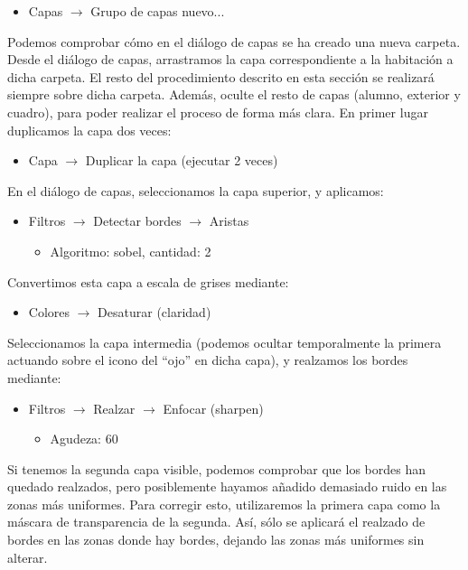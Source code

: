 \documentclass[es,practica]{uah}
\begin{document}
\begin{itemize}
	\item Capas $\rightarrow$ Grupo de capas nuevo...
\end{itemize}

Podemos comprobar cómo en el diálogo de capas se ha creado una nueva carpeta. Desde el diálogo de capas, arrastramos la capa correspondiente a la habitación a dicha carpeta. El resto del procedimiento descrito en esta sección se realizará siempre sobre dicha carpeta. Además, oculte el resto de capas (alumno, exterior y cuadro), para poder realizar el proceso de forma más clara. En primer lugar duplicamos la capa dos veces:

\begin{itemize}
	\item Capa $\rightarrow$ Duplicar la capa (ejecutar 2 veces)
\end{itemize}

En el diálogo de capas, seleccionamos la capa superior, y aplicamos:

\begin{itemize}
	\item Filtros $\rightarrow$ Detectar bordes $\rightarrow$ Aristas
	\begin{itemize}
		\item Algoritmo: sobel, cantidad: 2
	\end{itemize}
\end{itemize}

Convertimos esta capa a escala de grises mediante:

\begin{itemize}
	\item Colores $\rightarrow$ Desaturar (claridad)
\end{itemize}

Seleccionamos la capa intermedia (podemos ocultar temporalmente la primera actuando sobre el icono del ``ojo'' en dicha capa), y realzamos los bordes mediante:
\begin{itemize}
	\item Filtros $\rightarrow$ Realzar $\rightarrow$ Enfocar (sharpen)
	\begin{itemize}
		\item Agudeza: 60
	\end{itemize}
\end{itemize}

Si tenemos la segunda capa visible, podemos comprobar que los bordes han quedado realzados, pero posiblemente hayamos añadido demasiado ruido en las zonas más uniformes. Para corregir esto, utilizaremos la primera capa como la máscara de transparencia de la segunda. Así, sólo se aplicará el realzado de bordes en las zonas donde hay bordes, dejando las zonas más uniformes sin alterar.
\end{document}
